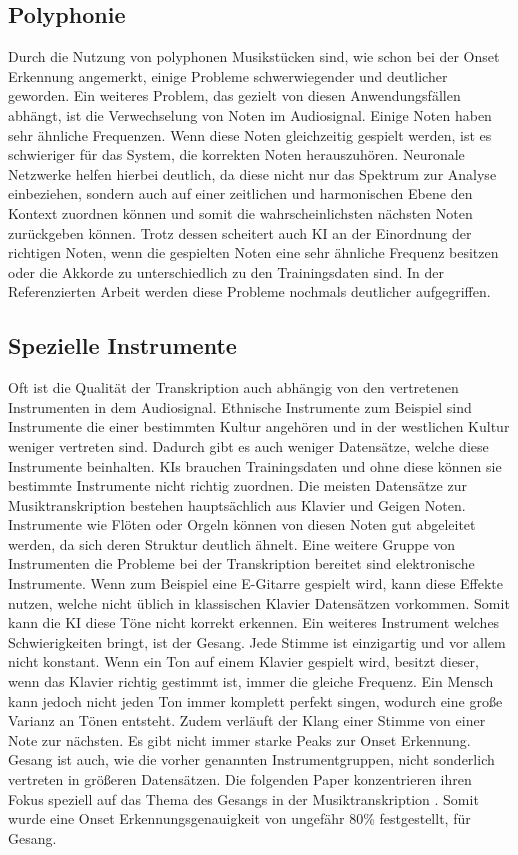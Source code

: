 \subsection{Polyphonie}
Durch die Nutzung von polyphonen Musikstücken sind, wie schon bei der Onset Erkennung angemerkt,
einige Probleme schwerwiegender und deutlicher geworden.
Ein weiteres Problem, das gezielt von diesen Anwendungsfällen abhängt, ist die Verwechselung von Noten im Audiosignal.
Einige Noten haben sehr ähnliche Frequenzen.
Wenn diese Noten gleichzeitig gespielt werden, ist es schwieriger für das System, die korrekten Noten herauszuhören.
Neuronale Netzwerke helfen hierbei deutlich, da diese nicht nur das Spektrum zur Analyse einbeziehen,
sondern auch auf einer zeitlichen und harmonischen Ebene den Kontext zuordnen können
und somit die wahrscheinlichsten nächsten Noten zurückgeben können.
Trotz dessen scheitert auch KI an der Einordnung der richtigen Noten, wenn die gespielten Noten
eine sehr ähnliche Frequenz besitzen oder die Akkorde zu unterschiedlich zu den Trainingsdaten sind.
In der Referenzierten Arbeit \cite{martak2022balancing} werden diese Probleme nochmals deutlicher aufgegriffen.

\subsection{Spezielle Instrumente}
Oft ist die Qualität der Transkription auch abhängig von den vertretenen Instrumenten in dem Audiosignal.
Ethnische Instrumente zum Beispiel sind Instrumente die einer bestimmten Kultur angehören
und in der westlichen Kultur weniger vertreten sind.
Dadurch gibt es auch weniger Datensätze, welche diese Instrumente beinhalten.
KIs brauchen Trainingsdaten und ohne diese können sie bestimmte Instrumente nicht richtig zuordnen.
Die meisten Datensätze zur Musiktranskription bestehen hauptsächlich aus Klavier und Geigen Noten.
Instrumente wie Flöten oder Orgeln können von diesen Noten gut abgeleitet werden,
da sich deren Struktur deutlich ähnelt.
Eine weitere Gruppe von Instrumenten die Probleme bei der Transkription bereitet sind elektronische Instrumente.
Wenn zum Beispiel eine E-Gitarre gespielt wird, kann diese Effekte nutzen,
welche nicht üblich in klassischen Klavier Datensätzen vorkommen.
Somit kann die KI diese Töne nicht korrekt erkennen.
Ein weiteres Instrument welches Schwierigkeiten bringt, ist der Gesang.
Jede Stimme ist einzigartig und vor allem nicht konstant.
Wenn ein Ton auf einem Klavier gespielt wird, besitzt dieser,
wenn das Klavier richtig gestimmt ist, immer die gleiche Frequenz.
Ein Mensch kann jedoch nicht jeden Ton immer komplett perfekt singen, wodurch eine große Varianz an Tönen entsteht.
Zudem verläuft der Klang einer Stimme von einer Note zur nächsten.
Es gibt nicht immer starke Peaks zur Onset Erkennung.
Gesang ist auch, wie die vorher genannten Instrumentgruppen, nicht sonderlich vertreten in größeren Datensätzen.
Die folgenden Paper konzentrieren ihren Fokus speziell auf das Thema des Gesangs in der Musiktranskription \cite{gu2023deep,gu2024automatic}.
Somit wurde eine Onset Erkennungsgenauigkeit von ungefähr 80\% festgestellt, für Gesang.

